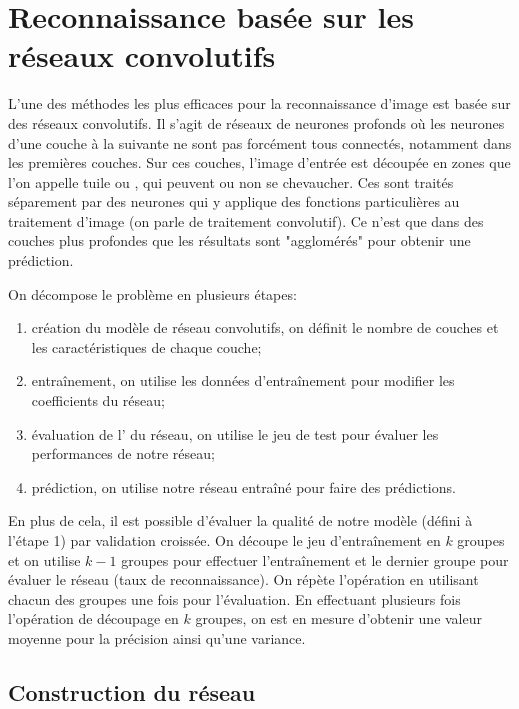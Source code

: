 
\chapter{Reconnaissance basée sur les réseaux convolutifs}

L'une des méthodes les plus efficaces pour la reconnaissance 
d'image est basée sur des réseaux convolutifs. 
Il s'agit de réseaux de neurones profonds où les neurones 
d'une couche à la suivante ne sont pas forcément tous connectés, 
notamment dans les premières couches.
Sur ces couches, l'image d'entrée est découpée en zones que l'on 
appelle tuile ou , qui peuvent ou non se chevaucher.
Ces  sont traités séparement par des neurones qui 
y applique des fonctions particulières au traitement d'image
(on parle de traitement convolutif).
Ce n'est que dans des couches plus profondes que les résultats 
sont "agglomérés" pour obtenir une prédiction.

On décompose le problème en plusieurs étapes:
\begin{enumerate}
  \item création du modèle de réseau convolutifs, on définit le nombre de 
  couches et les caractéristiques de chaque couche;
  \item entraînement, on utilise les données d'entraînement pour modifier les 
  coefficients du réseau;
  \item évaluation de l' du réseau, on utilise le jeu de test 
  pour évaluer les performances de notre réseau;
  \item prédiction, on utilise notre réseau entraîné pour faire des prédictions.
\end{enumerate}

En plus de cela, il est possible d'évaluer la qualité de notre modèle (défini 
à l'étape 1) par validation croissée. 
On découpe le jeu d'entraînement en $k$ groupes et on utilise $k-1$ groupes 
pour effectuer l'entraînement et le dernier groupe pour évaluer le réseau (taux 
de reconnaissance). 
On répète l'opération en utilisant chacun des groupes une fois pour l'évaluation.
En effectuant plusieurs fois l'opération de découpage en $k$ groupes, on 
est en mesure d'obtenir une valeur moyenne pour la précision ainsi qu'une variance. 



\section{Construction du réseau}

